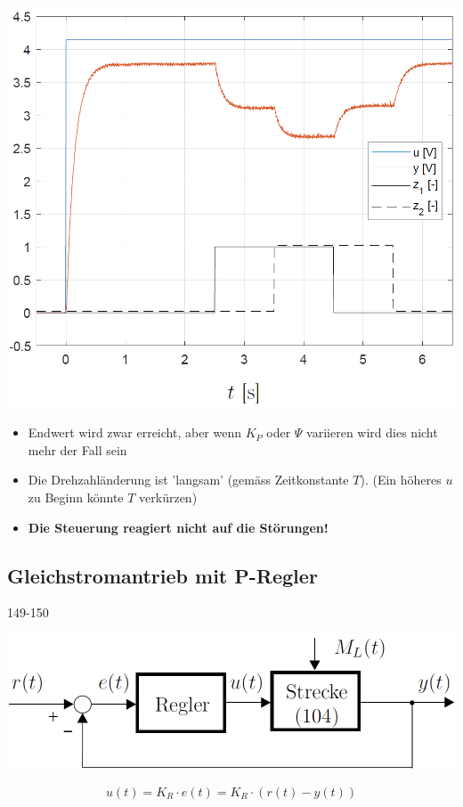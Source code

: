 \begin{minipage}[c]{0.4\columnwidth}
    \includegraphics[width=\columnwidth]{images/gleichstromantrieb_steuerung_step-response.png}
\end{minipage}
\hfill
\begin{minipage}[c]{0.48\columnwidth}
    \begin{itemize}
        \item Endwert wird zwar erreicht, aber wenn $K_P$ oder $\Psi$ variieren wird dies nicht mehr der Fall sein
        \item Die Drehzahländerung ist 'langsam' (gemäss Zeitkonstante $T$). (Ein höheres $u$ zu Beginn könnte $T$ verkürzen)
        \item \textbf{Die Steuerung reagiert nicht auf die Störungen!}
    \end{itemize}
\end{minipage}


\subsection{Gleichstromantrieb mit P-Regler}{149-150}

\begin{minipage}[c]{0.4\columnwidth}
    \includegraphics[width=\columnwidth]{images/gleichstromantrieb_p-regler.png}
\end{minipage}
\hfill
\begin{minipage}[c]{0.48\columnwidth}
    $$ u(t) = K_R \cdot e(t) = K_R \cdot ( r(t) - y(t) )$$
\end{minipage}

